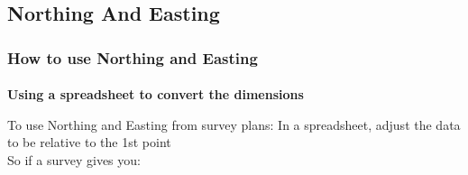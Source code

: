 %
%
%
%
% 
\subsection{Northing And Easting}

\subsubsection[How to use]{How to use Northing and Easting}
%
%
\paragraph[Use a Spreadsheet]{}\textbf{{\Large Using a spreadsheet to convert the dimensions}}

%
\noindent To use Northing and Easting from survey plans: In a spreadsheet, adjust the data to be relative to the 1st point\\
\noindent So if a survey gives you:\\

\begin{table}[htbp]
\centering
{}
\caption{Survey Plan Northing and Easting}
\end{table}

